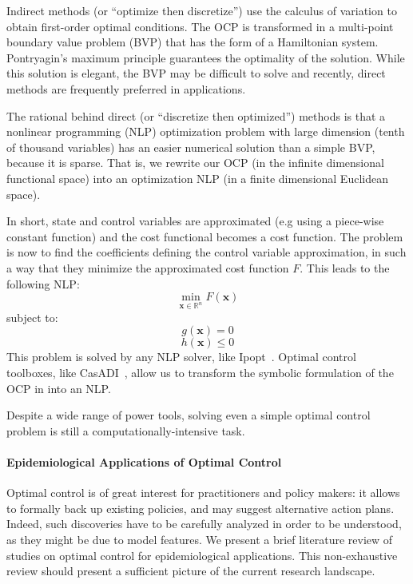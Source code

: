 \par Indirect methods (or ``optimize then discretize'') use the calculus of variation to obtain first-order optimal conditions. The OCP is transformed in a multi-point boundary value problem (BVP) that has the form of a Hamiltonian system. Pontryagin's maximum principle guarantees the optimality of the solution. While this solution is elegant, the BVP may be difficult to solve and recently, direct methods are frequently preferred in applications.

\par The rational behind direct (or ``discretize then optimized'') methods is that a nonlinear programming (NLP) optimization problem with large dimension (tenth of thousand variables) has an easier numerical solution than a simple BVP, because it is sparse. That is, we rewrite our OCP (in the infinite dimensional functional space) into an optimization NLP (in a finite dimensional Euclidean space). 

In short, state and control variables are approximated (e.g using a piece-wise constant function) and the cost functional becomes a cost function. The problem is now to find the coefficients defining the control variable approximation, in such a way that they minimize the approximated cost function $F$. This leads to the following NLP:
\begin{equation}
\min_{\textbf{x} \in \mathbb{R}^n} F(\textbf{x})
\end{equation}
subject to:
\begin{equation}
g(\textbf{x}) = 0
\end{equation}    
\begin{equation}
h(\textbf{x}) \leq 0
\end{equation}
This problem is solved by any NLP solver, like Ipopt~\cite{wachter_implementation_2006}.   Optimal control toolboxes, like CasADI~\cite{andersson_casadi:_2012}, allow us to transform the symbolic formulation of the OCP in into an NLP. 

Despite a wide range of power tools, solving even a simple  optimal control problem is still a computationally-intensive task.

\paragraph{Epidemiological Applications of Optimal Control}

Optimal control is of great interest for practitioners and policy makers: it allows to formally back up existing policies, and may suggest alternative action plans. Indeed, such discoveries have to be carefully analyzed in order to be understood, as they might be due to model features. We present a brief literature review of studies on optimal control for epidemiological applications. This non-exhaustive review should present a sufficient picture of the current research landscape.


